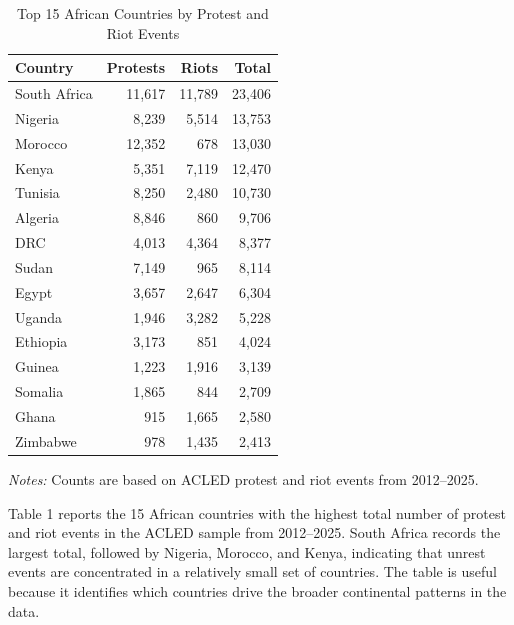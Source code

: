 \documentclass[12pt]{article}
\begin{document}
\begin{table}[!htbp]
\centering
\caption{Top 15 African Countries by Protest and Riot Events}
\vspace{0.5em}
\begin{minipage}{0.68\textwidth}
\centering
\begin{tabular}{lrrr}
\toprule
Country         & Protests  & Riots     & Total \\
\midrule
South Africa    & 11,617    & 11,789    & 23,406 \\
Nigeria         & 8,239     & 5,514     & 13,753 \\
Morocco         & 12,352    & 678       & 13,030 \\
Kenya           & 5,351     & 7,119     & 12,470 \\
Tunisia         & 8,250     & 2,480     & 10,730 \\
Algeria         & 8,846     & 860       & 9,706 \\
DRC             & 4,013     & 4,364     & 8,377 \\
Sudan           & 7,149     & 965       & 8,114 \\
Egypt           & 3,657     & 2,647     & 6,304 \\
Uganda          & 1,946     & 3,282     & 5,228 \\
Ethiopia        & 3,173     & 851       & 4,024 \\
Guinea          & 1,223     & 1,916     & 3,139 \\
Somalia         & 1,865     & 844       & 2,709 \\
Ghana           & 915       & 1,665     & 2,580 \\
Zimbabwe        & 978       & 1,435     & 2,413 \\
\bottomrule
\end{tabular}

\vspace{0.5em}
\footnotesize
\textit{Notes:} Counts are based on ACLED protest and riot events from 2012--2025.
\end{minipage}
\end{table}

\noindent Table 1 reports the 15 African countries with the highest total number of protest and riot events in the ACLED sample from 2012–2025. South Africa records the largest total, followed by Nigeria, Morocco, and Kenya, indicating that unrest events are concentrated in a relatively small set of countries. The table is useful because it identifies which countries drive the broader continental patterns in the data.
\end{document}
